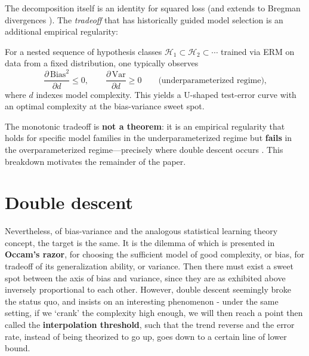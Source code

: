 \documentclass[
  journal=largetwo,
  simfonts=false,
  year=2025,
  volume=37,
]{cup-journal}
\begin{document}
The decomposition itself is an identity for squared loss (and extends to Bregman divergences \cite{PfauBregmanDivergence}). The \textit{tradeoff} that has historically guided model selection is an additional empirical regularity:

\begin{hypothesis}\label{thm:bias-variance}
For a nested sequence of hypothesis classes $\mathcal{H}_1\subset\mathcal{H}_2\subset\cdots$ trained via ERM on data from a fixed distribution, one typically observes
\begin{equation}
    \frac{\partial\,\mathrm{Bias}^2}{\partial d}\leq 0,\qquad
    \frac{\partial\,\mathrm{Var}}{\partial d}\geq 0
    \qquad\text{(underparameterized regime),}
\end{equation}
where $d$ indexes model complexity. This yields a U-shaped test-error curve with an optimal complexity at the bias-variance sweet spot.
\end{hypothesis}

\begin{remark}\label{rmk:bv_failure}
The monotonic tradeoff is \textbf{not a theorem}: it is an empirical regularity that holds for specific model families in the underparameterized regime but \textbf{fails} in the overparameterized regime---precisely where double descent occurs \cite{belkin_reconciling_2019,neal2019biasvariancetradeofftextbooksneed}. This breakdown motivates the remainder of the paper.
\end{remark}

\section{Double descent}\label{sec:double_descent}

Nevertheless, of bias-variance and the analogous statistical learning theory concept, the target is the same. It is the dilemma of which is presented in \textbf{Occam's razor}, for choosing the sufficient model of good complexity, or bias, for tradeoff of its generalization ability, or variance. Then there must exist a sweet spot between the axis of bias and variance, since they are as exhibited above inversely proportional to each other. However, double descent seemingly broke the status quo, and insists on an interesting phenomenon - under the same setting, if we `crank' the complexity high enough, we will then reach a point then called the \textbf{interpolation threshold}, such that the trend reverse and the error rate, instead of being theorized to go up, goes down to a certain line of lower bound. 
\end{document}
